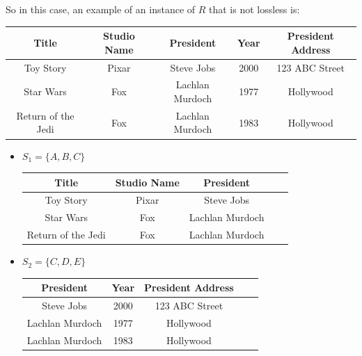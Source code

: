 \documentclass[12pt]{article}
\begin{document}
\begin{enumerate}[1.]
\begin{enumerate}[a)]
        \bigskip

        So in this case, an example of an instance of $R$ that is not lossless
        is:

        \bigskip

        \begin{tabular}{|c|c|c|c|c|}
            \hline
            Title & Studio Name & President & Year & President Address\\
            \hline
            Toy Story & Pixar & Steve Jobs & 2000 & 123 ABC Street\\
            \hline
            Star Wars & Fox & Lachlan Murdoch & 1977 & Hollywood\\
            \hline
            Return of the Jedi & Fox & Lachlan Murdoch & 1983 & Hollywood\\
            \hline
        \end{tabular}

        \bigskip

        \begin{itemize}
            \item $S_1 = \{A,B,C\}$

            \bigskip

            \begin{tabular}{|c|c|c|c|c|}
                \hline
                Title & Studio Name & President\\
                \hline
                Toy Story & Pixar & Steve Jobs\\
                \hline
                Star Wars & Fox & Lachlan Murdoch\\
                \hline
                Return of the Jedi & Fox & Lachlan Murdoch\\
                \hline
            \end{tabular}

            \item $S_2 = \{C,D,E\}$

            \bigskip

            \begin{tabular}{|c|c|c|c|c|}
                \hline
                President & Year & President Address\\
                \hline
                Steve Jobs & 2000 & 123 ABC Street\\
                \hline
                Lachlan Murdoch & 1977 & Hollywood\\
                \hline
                Lachlan Murdoch & 1983 & Hollywood\\
                \hline
            \end{tabular}


\end{itemize}
\end{enumerate}
\end{enumerate}
\end{document}
